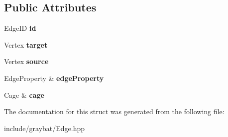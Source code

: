 \subsection*{Public Attributes}
\begin{DoxyCompactItemize}
\item 
\hypertarget{structCommunicationEdge_a9f736ff584d124c790461d112539a6fb}{}Edge\+I\+D {\bfseries id}\label{structCommunicationEdge_a9f736ff584d124c790461d112539a6fb}

\item 
\hypertarget{structCommunicationEdge_aff4e606aaceaf84765361a9902efeb7d}{}Vertex {\bfseries target}\label{structCommunicationEdge_aff4e606aaceaf84765361a9902efeb7d}

\item 
\hypertarget{structCommunicationEdge_a060dbd77e9c0bb4c4b18380ca7737553}{}Vertex {\bfseries source}\label{structCommunicationEdge_a060dbd77e9c0bb4c4b18380ca7737553}

\item 
\hypertarget{structCommunicationEdge_a7c4e8b6060785c0884a00c409925e108}{}Edge\+Property \& {\bfseries edge\+Property}\label{structCommunicationEdge_a7c4e8b6060785c0884a00c409925e108}

\item 
\hypertarget{structCommunicationEdge_a0e5acd688ef9fcd99e7b18032c98a6ca}{}Cage \& {\bfseries cage}\label{structCommunicationEdge_a0e5acd688ef9fcd99e7b18032c98a6ca}

\end{DoxyCompactItemize}


The documentation for this struct was generated from the following file\+:\begin{DoxyCompactItemize}
\item 
include/graybat/Edge.\+hpp\end{DoxyCompactItemize}
